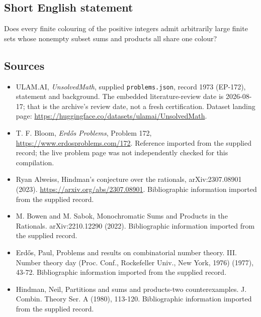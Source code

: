 \documentclass[11pt,a4paper]{article}
\begin{document}
\subsection{Short English statement}

Does every finite colouring of the positive integers admit arbitrarily large finite sets whose nonempty subset sums and products all share one colour?

\subsection{Sources}

{\small

\begin{itemize}

\item[\hypertarget{source:1973:1}{S1}] ULAM.AI, \emph{UnsolvedMath}, supplied \texttt{problems.json}, record 1973 (EP-172), statement and background. The embedded literature-review date is 2026-08-17; that is the archive’s review date, not a fresh certification. Dataset landing page: \url{https://huggingface.co/datasets/ulamai/UnsolvedMath}.

\item[\hypertarget{source:1973:2}{S2}] T. F. Bloom, \emph{Erdős Problems}, Problem 172, \url{https://www.erdosproblems.com/172}. Reference imported from the supplied record; the live problem page was not independently checked for this compilation.

\item[\hypertarget{source:1973:3}{S3}] Ryan Alweiss, Hindman's conjecture over the rationals, arXiv:2307.08901 (2023). \url{https://arxiv.org/abs/2307.08901}. Bibliographic information imported from the supplied record.

\item[\hypertarget{source:1973:4}{S4}] M. Bowen and M. Sabok, Monochromatic Sums and Products in the Rationals. arXiv:2210.12290 (2022). Bibliographic information imported from the supplied record.

\item[\hypertarget{source:1973:5}{S5}] Erd\H{o}s, Paul, Problems and results on combinatorial number theory. III. Number theory day (Proc. Conf., Rockefeller Univ., New York, 1976) (1977), 43-72. Bibliographic information imported from the supplied record.

\item[\hypertarget{source:1973:6}{S6}] Hindman, Neil, Partitions and sums and products-two counterexamples. J. Combin. Theory Ser. A (1980), 113-120. Bibliographic information imported from the supplied record.

\end{itemize}

}

\label{end:1973}
\end{document}
